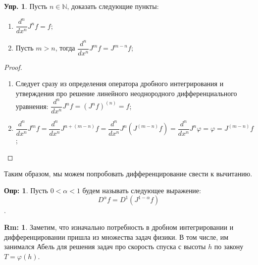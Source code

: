\documentclass[12pt]{article}
\newcommand{\MN}{\mathbb{N}}
\theoremstyle{definition}
\newtheorem{defn}{Опр:}
\newtheorem{rem}{Rm:}
\newtheorem{exrc}{Упр.}
\begin{document}
\begin{exrc}
	Пусть $n \in \MN$, доказать следующие пункты:
	\begin{enumerate}[label=(\arabic*)]
		\item $\dfrac{d^n}{dx^n}J^{n}f= f$;
		\item Пусть $m > n$, тогда $\dfrac{d^n}{dx^n}J^m f = J^{m-n}f$;
	\end{enumerate}
\end{exrc}
\begin{proof}\hfill
	\begin{enumerate}[label=(\arabic*)]
		\item Следует сразу из определения оператора дробного интегрирования и утверждения про решение линейного неоднородного дифференциального уравнения: $\dfrac{d^n}{dx^n}J^{n}f = \left(J^n f\right)^{(n)} = f$;
		\item $\dfrac{d^n}{dx^n}J^m f = \dfrac{d^n}{dx^n}J^{n + (m - n)} f = \dfrac{d^n}{dx^n}J^{n} \left(J^{(m - n)} f\right) = \dfrac{d^n}{dx^n}J^{n}\varphi= \varphi = J^{(m-n)}f$;
	\end{enumerate}
\end{proof}
Таким образом, мы можем попробовать дифференцирование свести к вычитанию.
\begin{defn}
	Пусть $0 < \alpha < 1$ будем называть следующее выражение:
	$$
		D^{\alpha}f = D^1 \left(J^{1 - \alpha}f\right)
	$$ 
	.
\end{defn}
\begin{rem}
	Заметим, что изначально потребность в дробном интегрировании и дифференцировании пришла из множества задач физики. В том числе, им занимался Абель для решения задач про скорость спуска с высоты $h$ по закону $T = \varphi(h)$.
\end{rem}
\end{document}

